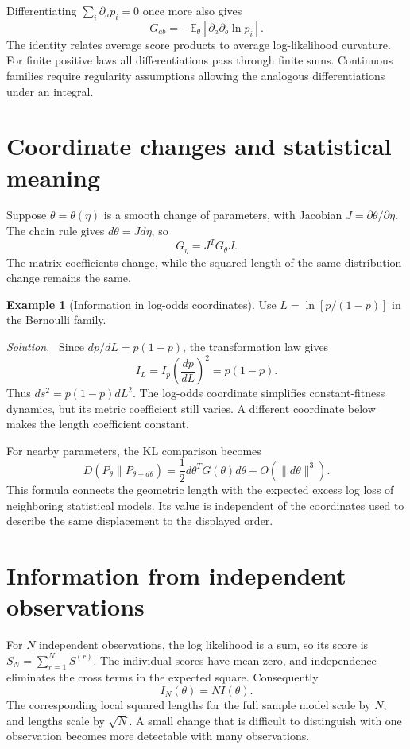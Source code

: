 \documentclass[11pt,oneside,openany]{book}
\theoremstyle{definition}
\newtheorem{example}{Example}[chapter]
\theoremstyle{remark}
\newenvironment{solution}{\par\smallskip\noindent\textit{Solution.}\ }{\par\smallskip}
\newcommand{\E}{\mathbb{E}}
\numberwithin{equation}{chapter}
\begin{document}
Differentiating $\sum_i\partial_ap_i=0$ once more also gives
\[
G_{ab}=-\E_\theta[\partial_a\partial_b\ln p_i].
\]
The identity relates average score products to average log-likelihood curvature. For finite positive laws all differentiations pass through finite sums. Continuous families require regularity assumptions allowing the analogous differentiations under an integral.

\section{Coordinate changes and statistical meaning}
Suppose $\theta=\theta(\eta)$ is a smooth change of parameters, with Jacobian $J=\partial\theta/\partial\eta$. The chain rule gives $d\theta=Jd\eta$, so
\begin{equation}\label{eq:metrictransform}
G_\eta=J^TG_\theta J.
\end{equation}
The matrix coefficients change, while the squared length of the same distribution change remains the same.

\begin{example}[Information in log-odds coordinates]
Use $L=\ln[p/(1-p)]$ in the Bernoulli family.
\begin{solution}
Since $dp/dL=p(1-p)$, the transformation law gives
\[
I_L=I_p\left(\frac{dp}{dL}\right)^2=p(1-p).
\]
Thus $ds^2=p(1-p)dL^2$. The log-odds coordinate simplifies constant-fitness dynamics, but its metric coefficient still varies. A different coordinate below makes the length coefficient constant.
\end{solution}
\end{example}

For nearby parameters, the KL comparison becomes
\[
D(P_\theta\|P_{\theta+d\theta})
=\frac12d\theta^TG(\theta)d\theta+O(\|d\theta\|^3).
\]
This formula connects the geometric length with the expected excess log loss of neighboring statistical models. Its value is independent of the coordinates used to describe the same displacement to the displayed order.

\section{Information from independent observations}
For $N$ independent observations, the log likelihood is a sum, so its score is $S_N=\sum_{r=1}^N S^{(r)}$. The individual scores have mean zero, and independence eliminates the cross terms in the expected square. Consequently
\begin{equation}\label{eq:sampleinformation}
I_N(\theta)=N I(\theta).
\end{equation}
The corresponding local squared lengths for the full sample model scale by $N$, and lengths scale by $\sqrt N$. A small change that is difficult to distinguish with one observation becomes more detectable with many observations.
\end{document}
